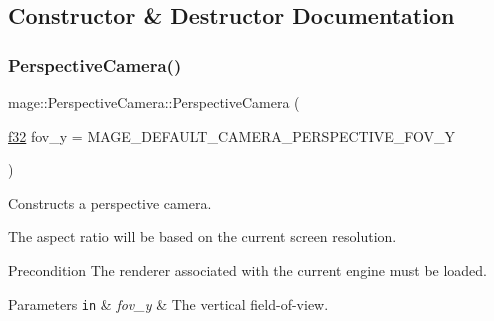 \subsection{Constructor \& Destructor Documentation}
\hypertarget{classmage_1_1_perspective_camera_a372f98432530a1270fd8cb42ffd899c6}{}\label{classmage_1_1_perspective_camera_a372f98432530a1270fd8cb42ffd899c6} 
\subsubsection{\texorpdfstring{Perspective\+Camera()}{PerspectiveCamera()}\hspace{0.1cm}{\footnotesize\ttfamily [1/6]}}
{\footnotesize\ttfamily mage\+::\+Perspective\+Camera\+::\+Perspective\+Camera (\begin{DoxyParamCaption}\item[{\hyperlink{namespacemage_a6a44ad388483959dc4dff9f2aef91431}{f32}}]{fov\+\_\+y = {\ttfamily MAGE\+\_\+DEFAULT\+\_\+CAMERA\+\_\+PERSPECTIVE\+\_\+FOV\+\_\+Y} }\end{DoxyParamCaption})\hspace{0.3cm}{\ttfamily [explicit]}}

Constructs a perspective camera.

The aspect ratio will be based on the current screen resolution.

\begin{DoxyPrecond}{Precondition}
The renderer associated with the current engine must be loaded. 
\end{DoxyPrecond}

\begin{DoxyParams}[1]{Parameters}
\mbox{\tt in}  & {\em fov\+\_\+y} & The vertical field-\/of-\/view. \\
\hline
\end{DoxyParams}
\hypertarget{classmage_1_1_perspective_camera_afc3d4ddf065a12815973d107300283f6}{}\label{classmage_1_1_perspective_camera_afc3d4ddf065a12815973d107300283f6} 
